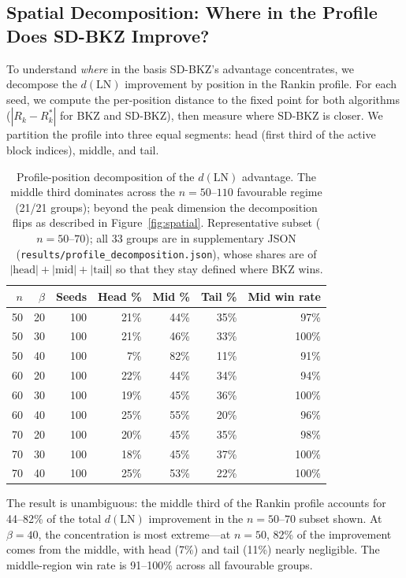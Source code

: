 \documentclass[journal=cic,version=preprint]{iacrj}
\begin{document}
\subsection{Spatial Decomposition: Where in the Profile Does SD-BKZ Improve?}
\label{sec:spatial}

To understand \emph{where} in the basis SD-BKZ's advantage concentrates, we decompose the $d(\mathrm{LN})$ improvement by position in the Rankin profile. For each seed, we compute the per-position distance to the fixed point for both algorithms ($|R_k - R^*_k|$ for BKZ and SD-BKZ), then measure where SD-BKZ is closer. We partition the profile into three equal segments: head (first third of the active block indices), middle, and tail.

\begin{table}[tbp]
\centering
\caption{Profile-position decomposition of the $d(\mathrm{LN})$ advantage. The middle third dominates across the $n=50$--$110$ favourable regime (21/21 groups); beyond the peak dimension the decomposition flips as described in Figure~\ref{fig:spatial}. Representative subset ($n=50$--$70$); all 33 groups are in supplementary JSON (\texttt{results/profile\_decomposition.json}), whose shares are of $|\text{head}|+|\text{mid}|+|\text{tail}|$ so that they stay defined where BKZ wins.\label{tab:spatial}}
\small
\begin{tabular}{rrrrrrr}
\hline
$n$ & $\beta$ & Seeds & Head \% & Mid \% & Tail \% & Mid win rate \\
\hline
50 & 20 & 100 & 21\% & 44\% & 35\% & 97\% \\
50 & 30 & 100 & 21\% & 46\% & 33\% & 100\% \\
50 & 40 & 100 & 7\%  & 82\% & 11\% & 91\% \\
60 & 20 & 100 & 22\% & 44\% & 34\% & 94\% \\
60 & 30 & 100 & 19\% & 45\% & 36\% & 100\% \\
60 & 40 & 100 & 25\% & 55\% & 20\% & 96\% \\
70 & 20 & 100 & 20\% & 45\% & 35\% & 98\% \\
70 & 30 & 100 & 18\% & 45\% & 37\% & 100\% \\
70 & 40 & 100 & 25\% & 53\% & 22\% & 100\% \\
\hline
\end{tabular}
\end{table}

The result is unambiguous: the middle third of the Rankin profile accounts for 44--82\% of the total $d(\mathrm{LN})$ improvement in the $n=50$--$70$ subset shown. At $\beta=40$, the concentration is most extreme---at $n=50$, 82\% of the improvement comes from the middle, with head (7\%) and tail (11\%) nearly negligible. The middle-region win rate is 91--100\% across all favourable groups.
\end{document}
